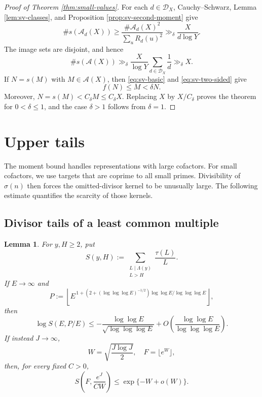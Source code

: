 \documentclass[11pt,letterpaper,reqno]{amsart}
\numberwithin{equation}{section}
\newtheorem{lemma}[theorem]{Lemma}
\theoremstyle{remark}
\newcommand{\1}{\mathbf 1}
\renewcommand{\leq}{\leqslant}
\renewcommand{\geq}{\geqslant}
\begin{document}
\begin{proof}[Proof of Theorem \ref{thm:small-values}]
For each $d\in\mathcal{D}_X$, Cauchy--Schwarz,
Lemma \ref{lem:sv-classes}, and Proposition \ref{prop:sv-second-moment} give
\[
 \#s(\mathcal{A}_d(X))
 \geq\frac{\#\mathcal{A}_d(X)^2}{\sum_uR_d(u)^2}
 \gg_\delta\frac{X}{d\log Y}.
\]
The image sets are disjoint, and hence
\[
 \#s(\mathcal{A}(X))
 \gg_\delta\frac{X}{\log Y}
 \sum_{d\in\mathcal{D}_X}\frac1d
 \gg_\delta X.
\]
If $N=s(M)$ with $M\in\mathcal{A}(X)$, then
\eqref{eq:sv-basic} and \eqref{eq:sv-two-sided} give
\[
 f(N)\leq M<\delta N.
\]
Moreover, $N=s(M)<C_\delta M\leq C_\delta X$. Replacing $X$ by $X/C_\delta$ proves the theorem
for $0<\delta\leq1$, and the case $\delta>1$ follows from $\delta=1$.
\end{proof}


\section{Upper tails}

The moment bound handles representations with large cofactors. For small
cofactors, we use targets that are coprime to all small primes. Divisibility
of $\sigma(n)$ then forces the omitted-divisor kernel to be unusually large.
The following estimate quantifies the scarcity of those kernels.

\subsection{Divisor tails of a least common multiple}

\begin{lemma}
\label{lem:kernel-tails}
For $y,H\geq2$, put
\[
 S(y,H):=\sum_{\substack{L\mid \Lambda(y)\\L>H}}\frac{\tau(L)}L.
\]
If $E\to\infty$ and
\[
 P:=\left\lfloor
 E^{\,1+(2+(\log\log\log E)^{-1/2})\log\log E/\log\log\log E}
 \right\rfloor,
\]
then
\begin{equation}\label{eq:fixed-kernel-tail}
 \log S(E,P/E)
 \leq-\frac{\log\log E}{\sqrt{\log\log\log E}}
 +O\left(\frac{\log\log E}{\log\log\log E}\right).
\end{equation}
If instead $J\to\infty$,
\[
 W=\sqrt{\frac{J\log J}{2}},
 \quad F=\lfloor e^W\rfloor,
\]
then, for every fixed $C>0$,
\begin{equation}\label{eq:moving-kernel-tail}
 S\left(F,\frac{e^J}{CW}\right)
 \leq\exp\{-W+o(W)\}.
\end{equation}
\end{lemma}
\end{document}
